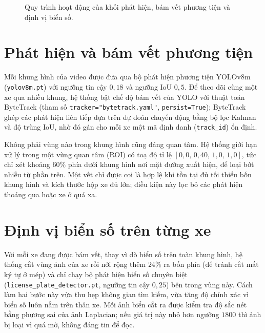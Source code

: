 \documentclass[12pt,a4paper]{report}
\begin{document}
\begin{figure}[H]
\centering
{}
\caption{Quy trình hoạt động của khối phát hiện, bám vết phương tiện và định vị biển số.}
\end{figure}


\section{Phát hiện và bám vết phương tiện}
Mỗi khung hình của video được đưa qua bộ phát hiện phương tiện YOLOv8m (\texttt{yolov8m.pt}) với ngưỡng tin cậy $0{,}18$ và ngưỡng IoU $0{,}5$. Để theo dõi cùng một xe qua nhiều khung, hệ thống bật chế độ bám vết của YOLO với thuật toán ByteTrack (tham số \texttt{tracker="bytetrack.yaml"}, \texttt{persist=True}); ByteTrack ghép các phát hiện liên tiếp dựa trên dự đoán chuyển động bằng bộ lọc Kalman và độ trùng IoU, nhờ đó gán cho mỗi xe một mã định danh (\texttt{track\_id}) ổn định.

Không phải vùng nào trong khung hình cũng đáng quan tâm. Hệ thống giới hạn xử lý trong một vùng quan tâm (ROI) có toạ độ tỉ lệ $[0{,}0,\,0{,}40,\,1{,}0,\,1{,}0]$, tức chỉ xét khoảng $60\%$ phía dưới khung hình nơi mặt đường xuất hiện, để loại bớt nhiễu từ phần trên. Một vết chỉ được coi là hợp lệ khi tồn tại đủ tối thiểu bốn khung hình và kích thước hộp xe đủ lớn; điều kiện này lọc bỏ các phát hiện thoáng qua hoặc xe ở quá xa.

\section{Định vị biển số trên từng xe}
Với mỗi xe đang được bám vết, thay vì dò biển số trên toàn khung hình, hệ thống cắt vùng ảnh của xe rồi nới rộng thêm $24\%$ ra bốn phía (để tránh cắt mất ký tự ở mép) và chỉ chạy bộ phát hiện biển số chuyên biệt (\texttt{license\_plate\_detector.pt}, ngưỡng tin cậy $0{,}25$) bên trong vùng này. Cách làm hai bước này vừa thu hẹp không gian tìm kiếm, vừa tăng độ chính xác vì biển số luôn nằm trên thân xe. Mỗi ảnh biển cắt ra được kiểm tra độ sắc nét bằng phương sai của ảnh Laplacian; nếu giá trị này nhỏ hơn ngưỡng $1800$ thì ảnh bị loại vì quá mờ, không đáng tin để đọc.
\end{document}
